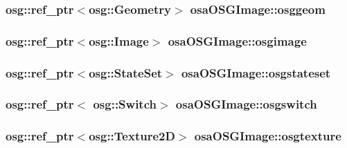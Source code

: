 \hypertarget{classosa_o_s_g_image_abfb175fcab2334aa3bd8c32fb49f0f23}{
\subsubsection[{osggeom}]{\setlength{\rightskip}{0pt plus 5cm}osg\-::ref\-\_\-ptr$<$osg\-::\-Geometry$>$ osa\-O\-S\-G\-Image\-::osggeom\hspace{0.3cm}{\ttfamily [protected]}}}\label{classosa_o_s_g_image_abfb175fcab2334aa3bd8c32fb49f0f23}
\hypertarget{classosa_o_s_g_image_a5ef367c2bc37b1fb525084a85ceb0142}{
\subsubsection[{osgimage}]{\setlength{\rightskip}{0pt plus 5cm}osg\-::ref\-\_\-ptr$<$osg\-::\-Image$>$ osa\-O\-S\-G\-Image\-::osgimage\hspace{0.3cm}{\ttfamily [protected]}}}\label{classosa_o_s_g_image_a5ef367c2bc37b1fb525084a85ceb0142}
\hypertarget{classosa_o_s_g_image_a67af38cab8be5f535eebd267813e0958}{
\subsubsection[{osgstateset}]{\setlength{\rightskip}{0pt plus 5cm}osg\-::ref\-\_\-ptr$<$osg\-::\-State\-Set$>$ osa\-O\-S\-G\-Image\-::osgstateset\hspace{0.3cm}{\ttfamily [protected]}}}\label{classosa_o_s_g_image_a67af38cab8be5f535eebd267813e0958}
\hypertarget{classosa_o_s_g_image_ae0c39af6fbb02f9cecd27d9c464c43a5}{
\subsubsection[{osgswitch}]{\setlength{\rightskip}{0pt plus 5cm}osg\-::ref\-\_\-ptr$<$ osg\-::\-Switch$>$ osa\-O\-S\-G\-Image\-::osgswitch\hspace{0.3cm}{\ttfamily [protected]}}}\label{classosa_o_s_g_image_ae0c39af6fbb02f9cecd27d9c464c43a5}
\hypertarget{classosa_o_s_g_image_aecdf8d95b41d0fd16155d38572394924}{
\subsubsection[{osgtexture}]{\setlength{\rightskip}{0pt plus 5cm}osg\-::ref\-\_\-ptr$<$osg\-::\-Texture2\-D$>$ osa\-O\-S\-G\-Image\-::osgtexture\hspace{0.3cm}{\ttfamily [protected]}}}\label{classosa_o_s_g_image_aecdf8d95b41d0fd16155d38572394924}
